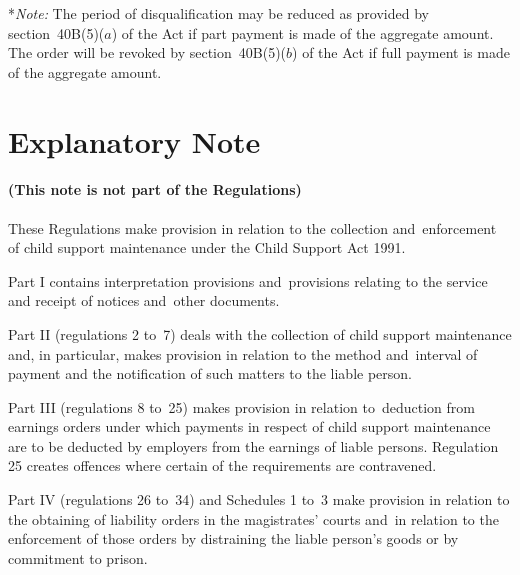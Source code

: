 \documentclass[12pt,a4paper]{article}
\begin{document}
\medskip

*\emph{Note:} The period of disqualification may be reduced as provided by section~40B(5)($a$) of the Act if part payment is made of the aggregate amount.  The order will be revoked by section~40B(5)($b$) of the Act if full payment is made of the aggregate amount.


\part{Explanatory Note}

\renewcommand\parthead{--- Explanatory Note}

\subsection*{(This note is not part of the Regulations)}

 These Regulations make provision in relation to the collection and~enforcement of child support maintenance under the Child Support Act 1991.

  Part I contains interpretation provisions and~provisions relating to the service and receipt of notices and~other documents.

  Part II (regulations 2 to~7) deals with the collection of child support maintenance and, in particular, makes provision in relation to the method and~interval of payment and the notification of such matters to the liable person.

  Part III (regulations 8 to~25) makes provision in relation to~deduction from earnings orders under which payments in respect of child support maintenance are to be deducted by employers from the earnings of liable persons. Regulation 25 creates offences where certain of the requirements are contravened.

  Part IV (regulations 26 to~34) and Schedules 1 to~3 make provision in relation to the obtaining of liability orders in the magistrates' courts and~in relation to the enforcement of those orders by distraining the liable person’s goods or by commitment to prison.
\end{document}
